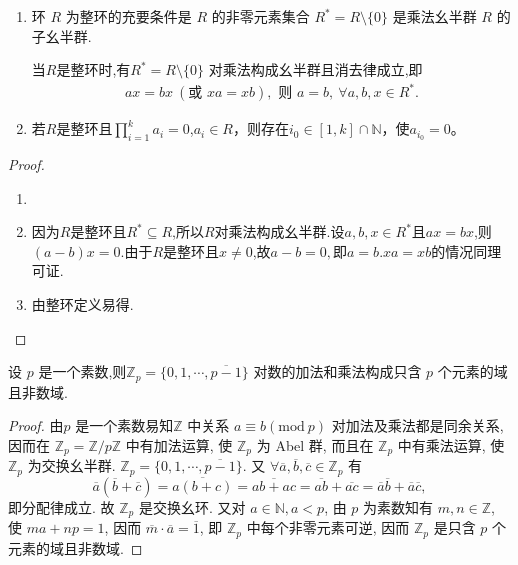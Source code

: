 \documentclass[../../main.tex]{subfiles}%
\begin{document}
\begin{proposition}\label{proposition:整环的一些性质}
\begin{enumerate}[(1)]
\item\label{proposition:整环的一些性质-2}  环 \( R \) 为整环的充要条件是 \( R \) 的非零元素集合 \( R^* = R \setminus \{0\} \) 是乘法幺半群 \( R \) 的子幺半群.

当\( R \)是整环时,有\( R^* = R \setminus \{0\} \) 对乘法构成幺半群且消去律成立,即
\begin{align*}
ax = bx \ (\text{或 } xa = xb), \text{ 则 } a = b, \ \forall a, b, x \in R^*.
\end{align*}

\item\label{proposition:整环的一些性质-3} 若$R$是整环且$\prod_{i=1}^k a_i = 0$,$a_i \in R$，则存在$i_0 \in [1, k] \cap \mathbb{N}$，使$a_{i_0} = 0$。
\end{enumerate}
\end{proposition}
\begin{proof}
\begin{enumerate}[(1)]
\item 

\item 因为$R$是整环且$R^*\subseteq R$,所以$R$对乘法构成幺半群.设$a,b,x\in R^*$且$ax=bx$,则$(a-b)x=0$.由于$R$是整环且$x\ne 0$,故$a-b=0,$即$a=b$.$xa=xb$的情况同理可证.

\item 由整环定义易得.
\end{enumerate}
\end{proof}

\begin{proposition}\label{proposition:Z_p是域且非数域}
设 \( p \) 是一个素数,则\( \mathbb{Z}_p=\{0,1,\cdots,\overline{p-1}\} \) 对数的加法和乘法构成只含 \( p \) 个元素的域且非数域.
\end{proposition}
\begin{proof}
由\( p \) 是一个素数易知\( \mathbb{Z} \) 中关系 \( a \equiv b(\text{mod}\ p) \) 对加法及乘法都是同余关系, 因而在 \( \mathbb{Z}_p = \mathbb{Z}/p\mathbb{Z} \) 中有加法运算, 使 \( \mathbb{Z}_p \) 为 Abel 群, 而且在 \( \mathbb{Z}_p \) 中有乘法运算, 使 \( \mathbb{Z}_p \) 为交换幺半群. \( \mathbb{Z}_p = \{0,1,\cdots,\overline{p-1}\} \). 又 \( \forall \overline{a},\overline{b},\overline{c} \in \mathbb{Z}_p \) 有
\[
\overline{a}(\overline{b} + \overline{c}) = \overline{a(b + c)} = \overline{ab + ac} = \overline{ab} + \overline{ac} = \overline{a}\overline{b} + \overline{a}\overline{c},
\]
即分配律成立. 故 \( \mathbb{Z}_p \) 是交换幺环. 又对 \( a \in \mathbb{N}, a < p \), 由 \( p \) 为素数知有 \( m,n \in \mathbb{Z} \), 使 \( ma + np = 1 \), 因而 \( \overline{m} \cdot \overline{a} = \overline{1} \), 即 \( \mathbb{Z}_p \) 中每个非零元素可逆, 因而 \( \mathbb{Z}_p \) 是只含 \( p \) 个元素的域且非数域.
\end{proof}
\end{document}
